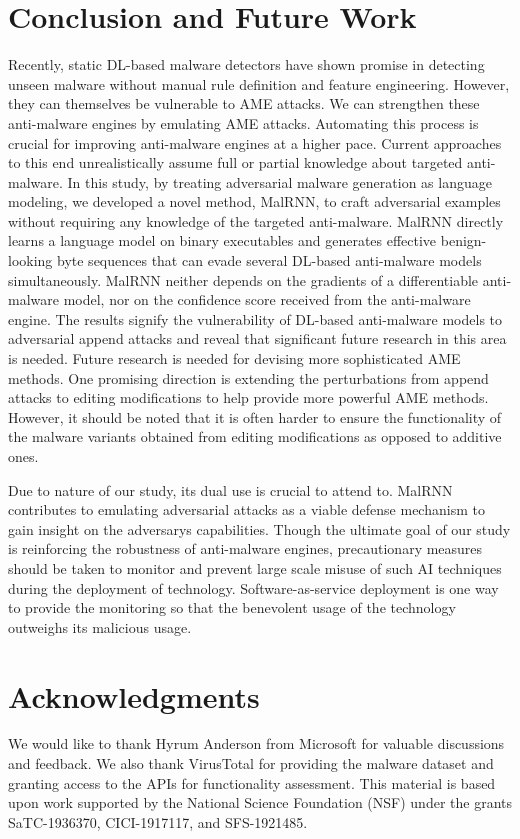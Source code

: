 \documentclass[letterpaper]{article}
\begin{document}
\section{Conclusion and Future Work}
Recently, static DL-based malware detectors have shown promise in detecting unseen malware without manual rule definition and feature engineering. However, they can themselves be vulnerable to AME attacks. We can strengthen these anti-malware engines by emulating AME attacks. Automating this process is crucial for improving anti-malware engines at a higher pace. Current approaches to this end unrealistically assume full or partial knowledge about targeted anti-malware. In this study, by treating adversarial malware generation as language modeling, we developed a novel method, MalRNN, to craft adversarial examples without requiring any knowledge of the targeted anti-malware. MalRNN directly learns a language model on binary executables and generates effective benign-looking byte sequences that can evade several DL-based anti-malware models simultaneously. MalRNN neither depends on the gradients of a differentiable anti-malware model, nor on the confidence score received from the anti-malware engine. The results signify the vulnerability of DL-based anti-malware models to adversarial append attacks and reveal that significant future research in this area is needed. Future research is needed for devising more sophisticated AME methods. One promising direction is extending the perturbations from append attacks to editing modifications to help provide more powerful AME methods. However, it should be noted that it is often harder to ensure the functionality of the malware variants obtained from editing modifications as opposed to additive ones.

Due to nature of our study, its dual use is crucial to attend to. MalRNN contributes to emulating adversarial attacks as a viable defense mechanism to gain insight on the adversarys capabilities. Though the ultimate goal of our study is reinforcing the robustness of anti-malware engines, precautionary measures should be taken to monitor and prevent large scale misuse of such AI techniques during the deployment of technology. Software-as-service deployment is one way to provide the monitoring so that the benevolent usage of the technology outweighs its malicious usage.

\section{ Acknowledgments}
We would like to thank Hyrum Anderson from Microsoft for valuable discussions and feedback. We also thank VirusTotal for providing the malware dataset and granting access to the APIs for functionality assessment.
This material is based upon work supported by the National Science Foundation (NSF) under the grants SaTC-1936370, CICI-1917117, and SFS-1921485.
\end{document}
